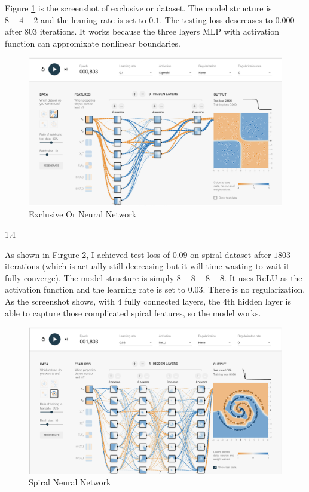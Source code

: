 \documentclass[11pt]{article}
\begin{document}
\begin{enumerate}
Figure \ref{fig:exclusive_or_nn} is the screenshot of exclusive or dataset. The model structure is $8-4-2$ and the leaning rate is set to $0.1$. The testing loss descreases to $0.000$ after $803$ iterations. It works because the three layers MLP with activation function can appromixate nonlinear boundaries.

\begin{figure}[!h]
  \centering
  \includegraphics[width=\linewidth]{figures/1_3/exclusive_or.png}
  \caption{Exclusive Or Neural Network}
  \label{fig:exclusive_or_nn}
\end{figure}

1.4
\medskip

As shown in Firgure \ref{fig:spiral_nn}, I achieved test loss of $0.09$ on spiral dataset after $1803$ iterations (which is actually still decreasing but it will time-wasting to wait it fully converge). The model structure is simply $8-8-8-8$. It uses ReLU as the activation function and the learning rate is set to $0.03$. There is no regularization. As the screenshot shows, with 4 fully connected layers, the 4th hidden layer is able to capture those complicated spiral features, so the model works.

\begin{figure}[!h]
  \centering
  \includegraphics[width=\linewidth]{figures/1_4/spiral.png}
  \caption{Spiral Neural Network}
  \label{fig:spiral_nn}
\end{figure}


\end{enumerate}
\end{document}
